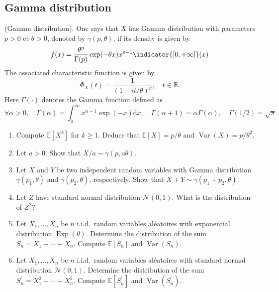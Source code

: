 \begin{center}
  \section*{Gamma distribution}
\end{center}


\begin{Exercise}
  (Gamma distribution). One says that $X$ has Gamma distribution with parameters $p>0$ et $\theta>0$, denoted by $\gamma(p, \theta)$, if its density is given by
  \[
    f(x)=\frac{\theta^{p}}{\Gamma(p)} \exp (-\theta x) x^{p-1} \indicator{ [0,+\infty[ }(x)
  \]
  The associated characteristic function is given by
  \[
    \Phi_{X}(t)=\frac{1}{{(1-i t / \theta)}^{p}}, \quad t \in \mathbb{R} .
  \]
  Here $\Gamma(\cdot)$ denotes the Gamma function defined as
  \[
    \forall \alpha>0, \quad \Gamma(\alpha)=\int_{0}^{\infty} x^{\alpha-1} \exp (-x) \mathrm{d} x, \quad \Gamma(\alpha+1)=\alpha \Gamma(\alpha), \quad \Gamma(1 / 2)=\sqrt{\pi}
  \]

  \begin{enumerate}
    \item Compute $\mathbb{E}\left[X^{k}\right]$ for $k \geq 1$. Deduce that
          $\mathbb{E}[X]=p / \theta$ and $\operatorname{Var}(X)=p / \theta^{2}$.
    \item Let $a>0$. Show that $X / a \sim \gamma(p, a \theta)$.
    \item Let $X$ and $Y$ be two independent random variables with Gamma distribution
          $\gamma\left(p_{1}, \theta\right)$ and $\gamma\left(p_{2}, \theta\right)$,
          respectively. Show that $X+Y \sim \gamma\left(p_{1}+p_{2}, \theta\right)$.

    \item Let $Z$ have standard normal distribution $\mathcal{N}(0,1)$. What is the
          distribution of $Z^{2}$?

    \item Let $X_{1}, \ldots, X_{n}$ be $n$ i.i.d.\, random variables aléatoires with
          exponential distribution $\operatorname{Exp}(\theta)$. Determine the
          distribution of the sum $S_{n}=X_{1}+\cdots+X_{n}$. Compute
          $\mathbb{E}\left[S_{n}\right]$ and $\operatorname{Var}\left(S_{n}\right)$.

    \item Let $X_{1}, \ldots, X_{n}$ be $n$ i.i.d.\, random variables aléatoires with
          standard normal distribution $\mathcal{N}(0,1)$. Determine the distribution of
          the sum $S_{n}^{\prime}=X_{1}^{2}+\cdots+X_{n}^{2}$. Compute
          $\mathbb{E}\left[S_{n}^{\prime}\right]$ and
          $\operatorname{Var}\left(S_{n}^{\prime}\right)$.
  \end{enumerate}
\end{Exercise}

